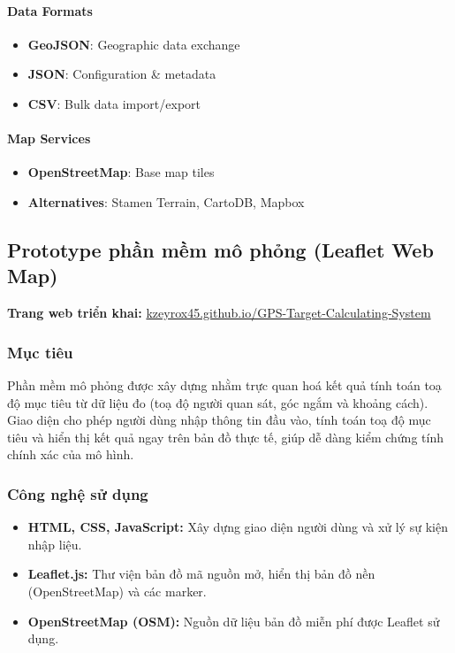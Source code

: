 \begin{itemize}
\paragraph{Data Formats}
\begin{itemize}[label=\textbullet]
    \item \textbf{GeoJSON}: Geographic data exchange
    \item \textbf{JSON}: Configuration \& metadata
    \item \textbf{CSV}: Bulk data import/export
\end{itemize}
\paragraph{Map Services}
\begin{itemize}[label=\textbullet]
    \item \textbf{OpenStreetMap}: Base map tiles
    \item \textbf{Alternatives}: Stamen Terrain, CartoDB, Mapbox
\end{itemize}
\end{itemize}

\newpage
\subsection{Prototype phần mềm mô phỏng (Leaflet Web Map)}
\textbf{Trang web triển khai:} \href{https://kzeyrox45.github.io/GPS-Target-Calculating-System/}{kzeyrox45.github.io/GPS-Target-Calculating-System}
\subsubsection{Mục tiêu}
Phần mềm mô phỏng được xây dựng nhằm trực quan hoá kết quả tính toán toạ độ mục tiêu từ dữ liệu đo (toạ độ người quan sát, góc ngắm và khoảng cách). 
Giao diện cho phép người dùng nhập thông tin đầu vào, tính toán toạ độ mục tiêu và hiển thị kết quả ngay trên bản đồ thực tế, giúp dễ dàng kiểm chứng tính chính xác của mô hình.

\subsubsection{Công nghệ sử dụng}
\begin{itemize}
    \item \textbf{HTML, CSS, JavaScript:} Xây dựng giao diện người dùng và xử lý sự kiện nhập liệu.
    \item \textbf{Leaflet.js:} Thư viện bản đồ mã nguồn mở, hiển thị bản đồ nền (OpenStreetMap) và các marker.
    \item \textbf{OpenStreetMap (OSM):} Nguồn dữ liệu bản đồ miễn phí được Leaflet sử dụng.
\end{itemize}

